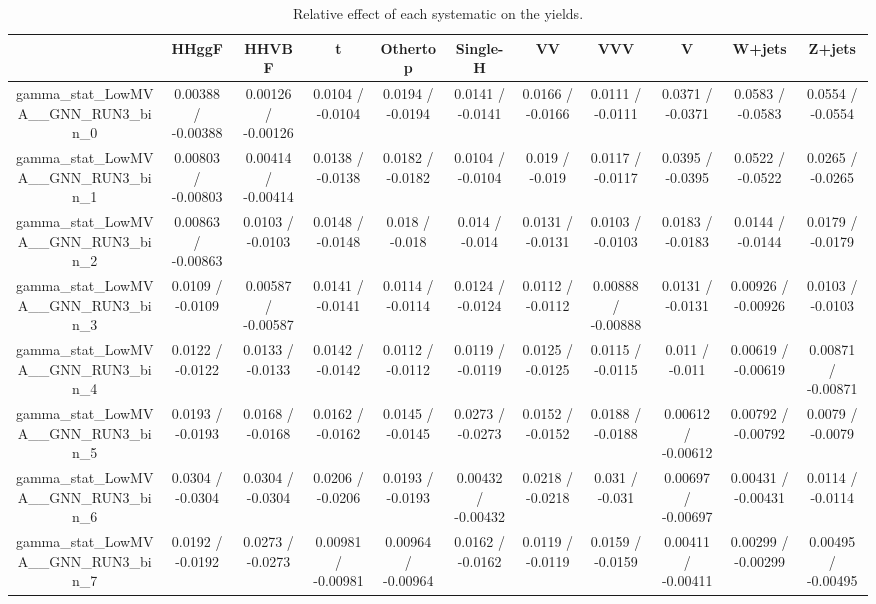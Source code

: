 \documentclass[10pt]{article}
\begin{document}
\begin{table}[htbp]
\begin{center}
\begin{tabular}{|c|c|c|c|c|c|c|c|c|c|c|}
\hline 
      & HHggF      & HHVBF      & t      & Othertop      & Single-H      & VV      & VVV      & V      & W+jets      & Z+jets \\ 
\hline 
  gamma_stat_LowMVA__GNN_RUN3_bin_0 & 0.00388 / -0.00388 & 0.00126 / -0.00126 & 0.0104 / -0.0104 & 0.0194 / -0.0194 & 0.0141 / -0.0141 & 0.0166 / -0.0166 & 0.0111 / -0.0111 & 0.0371 / -0.0371 & 0.0583 / -0.0583 & 0.0554 / -0.0554 \\ 
  gamma_stat_LowMVA__GNN_RUN3_bin_1 & 0.00803 / -0.00803 & 0.00414 / -0.00414 & 0.0138 / -0.0138 & 0.0182 / -0.0182 & 0.0104 / -0.0104 & 0.019 / -0.019 & 0.0117 / -0.0117 & 0.0395 / -0.0395 & 0.0522 / -0.0522 & 0.0265 / -0.0265 \\ 
  gamma_stat_LowMVA__GNN_RUN3_bin_2 & 0.00863 / -0.00863 & 0.0103 / -0.0103 & 0.0148 / -0.0148 & 0.018 / -0.018 & 0.014 / -0.014 & 0.0131 / -0.0131 & 0.0103 / -0.0103 & 0.0183 / -0.0183 & 0.0144 / -0.0144 & 0.0179 / -0.0179 \\ 
  gamma_stat_LowMVA__GNN_RUN3_bin_3 & 0.0109 / -0.0109 & 0.00587 / -0.00587 & 0.0141 / -0.0141 & 0.0114 / -0.0114 & 0.0124 / -0.0124 & 0.0112 / -0.0112 & 0.00888 / -0.00888 & 0.0131 / -0.0131 & 0.00926 / -0.00926 & 0.0103 / -0.0103 \\ 
  gamma_stat_LowMVA__GNN_RUN3_bin_4 & 0.0122 / -0.0122 & 0.0133 / -0.0133 & 0.0142 / -0.0142 & 0.0112 / -0.0112 & 0.0119 / -0.0119 & 0.0125 / -0.0125 & 0.0115 / -0.0115 & 0.011 / -0.011 & 0.00619 / -0.00619 & 0.00871 / -0.00871 \\ 
  gamma_stat_LowMVA__GNN_RUN3_bin_5 & 0.0193 / -0.0193 & 0.0168 / -0.0168 & 0.0162 / -0.0162 & 0.0145 / -0.0145 & 0.0273 / -0.0273 & 0.0152 / -0.0152 & 0.0188 / -0.0188 & 0.00612 / -0.00612 & 0.00792 / -0.00792 & 0.0079 / -0.0079 \\ 
  gamma_stat_LowMVA__GNN_RUN3_bin_6 & 0.0304 / -0.0304 & 0.0304 / -0.0304 & 0.0206 / -0.0206 & 0.0193 / -0.0193 & 0.00432 / -0.00432 & 0.0218 / -0.0218 & 0.031 / -0.031 & 0.00697 / -0.00697 & 0.00431 / -0.00431 & 0.0114 / -0.0114 \\ 
  gamma_stat_LowMVA__GNN_RUN3_bin_7 & 0.0192 / -0.0192 & 0.0273 / -0.0273 & 0.00981 / -0.00981 & 0.00964 / -0.00964 & 0.0162 / -0.0162 & 0.0119 / -0.0119 & 0.0159 / -0.0159 & 0.00411 / -0.00411 & 0.00299 / -0.00299 & 0.00495 / -0.00495 \\ 
\hline 
\end{tabular} 
\caption{Relative effect of each systematic on the yields.} 
\end{center} 
\end{table} 
\end{document}
